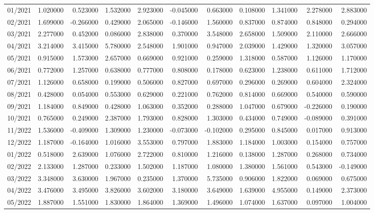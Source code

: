 \begin{tabular}{lrrrrrrrrrr}
01/2021 & 1.020000 & 0.523000 & 1.532000 & 2.923000 & -0.045000 & 0.663000 & 0.108000 & 1.341000 & 2.278000 & 2.883000 \\
02/2021 & 1.699000 & -0.266000 & 0.429000 & 2.065000 & -0.146000 & 1.560000 & 0.837000 & 0.874000 & 0.848000 & 0.294000 \\
03/2021 & 2.277000 & 0.452000 & 0.086000 & 2.838000 & 0.370000 & 3.548000 & 2.658000 & 1.509000 & 2.110000 & 2.666000 \\
04/2021 & 3.214000 & 3.415000 & 5.780000 & 2.548000 & 1.901000 & 0.947000 & 2.039000 & 1.429000 & 1.320000 & 3.057000 \\
05/2021 & 0.915000 & 1.573000 & 2.657000 & 0.669000 & 0.921000 & 0.259000 & 1.318000 & 0.587000 & 1.126000 & 1.170000 \\
06/2021 & 0.772000 & 1.257000 & 0.638000 & 0.777000 & 0.808000 & 0.178000 & 0.623000 & 1.238000 & 0.611000 & 1.712000 \\
07/2021 & 1.126000 & 0.658000 & 0.199000 & 0.506000 & 0.827000 & 0.697000 & 0.296000 & 0.269000 & 0.604000 & 2.324000 \\
08/2021 & 0.428000 & 0.054000 & 0.553000 & 0.629000 & 0.221000 & 0.762000 & 0.814000 & 0.669000 & 0.540000 & 0.590000 \\
09/2021 & 1.184000 & 0.849000 & 0.428000 & 1.063000 & 0.352000 & 0.288000 & 1.047000 & 0.679000 & -0.226000 & 0.190000 \\
10/2021 & 0.765000 & 0.249000 & 2.387000 & 1.793000 & 0.828000 & 1.303000 & 0.434000 & 0.749000 & -0.089000 & 0.391000 \\
11/2022 & 1.536000 & -0.409000 & 1.309000 & 1.230000 & -0.073000 & -0.102000 & 0.295000 & 0.845000 & 0.017000 & 0.913000 \\
12/2022 & 1.187000 & -0.164000 & 1.016000 & 3.553000 & 0.797000 & 1.883000 & 1.184000 & 1.003000 & 0.154000 & 0.757000 \\
01/2022 & 0.518000 & 2.639000 & 1.076000 & 2.722000 & 0.810000 & 1.216000 & 0.138000 & 1.287000 & 0.268000 & 0.734000 \\
02/2022 & 2.133000 & 1.287000 & 0.233000 & 1.502000 & 1.187000 & 1.080000 & 1.380000 & 1.561000 & 0.543000 & -0.149000 \\
03/2022 & 3.348000 & 3.630000 & 1.967000 & 0.235000 & 1.370000 & 5.735000 & 0.906000 & 1.822000 & 0.069000 & 0.675000 \\
04/2022 & 3.476000 & 3.495000 & 3.826000 & 3.602000 & 3.180000 & 3.649000 & 1.639000 & 4.955000 & 0.149000 & 2.373000 \\
05/2022 & 1.887000 & 1.551000 & 1.830000 & 1.864000 & 1.369000 & 1.496000 & 1.074000 & 1.637000 & 0.097000 & 1.004000 \\

\end{tabular}
